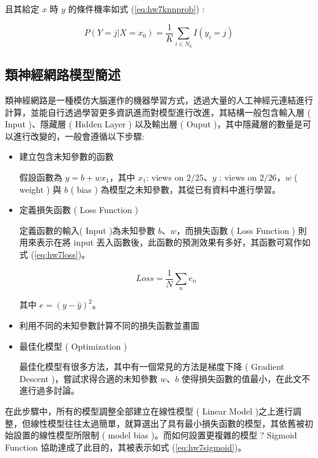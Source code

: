 且其給定 $x$ 時 $y$ 的條件機率如式 (\ref{eq:hw7knnprob}) :

\begin{equation}\label{eq:hw7knnprob}
P(Y=j|X=x_0)=\frac{1}{K}\sum_{i \in N_0}I(y_i=j)
\end{equation}


\subsection{類神經網路模型簡述}

類神經網路是一種模仿大腦運作的機器學習方式，透過大量的人工神經元連結進行計算，並能自行透過學習更多資訊進而對模型進行改進，其結構一般包含輸入層 ( Input )、隱藏層 ( Hidden Layer ) 以及輸出層 ( Ouput )，其中隱藏層的數量是可以進行改變的，一般會遵循以下步驟:

\begin{itemize}
\item{} 建立包含未知參數的函數

假設函數為 $y=b+w x_1$，其中 $x_1$: views on $2/25$、$y$ : views on $2/26$，$w$ ( weight ) 與 $b$ ( bias ) 為模型之未知參數，其從已有資料中進行學習。

\item{} 定義損失函數 ( Loss Function )

定義函數的輸入( Input )為未知參數 $b$、$w$，而損失函數 ( Loss Function ) 則用來表示在將 input 丟入函數後，此函數的預測效果有多好，其函數可寫作如式 (\ref{eq:hw7loss})。

\begin{equation}\label{eq:hw7loss}
Loss = \frac{1}{N}\sum_{n}e_n
\end{equation}

其中 $e=(y-\hat{y})^{2}$。

\item{} 利用不同的未知參數計算不同的損失函數並畫圖

\item{} 最佳化模型 ( Optimization )

最佳化模型有很多方法，其中有一個常見的方法是梯度下降 ( Gradient Descent )，嘗試求得合適的未知參數 $w$、$b$ 使得損失函數的值最小，在此文不進行過多討論。

\end{itemize}

在此步驟中，所有的模型調整全部建立在線性模型 ( Linear Model )之上進行調整，但線性模型往往太過簡單，就算選出了具有最小損失函數的模型，其依舊被初始設置的線性模型所限制 ( model bias )。而如何設置更複雜的模型 $?$ Sigmoid Function 協助達成了此目的，其被表示如式 (\ref{eq:hw7sigmoid})。

